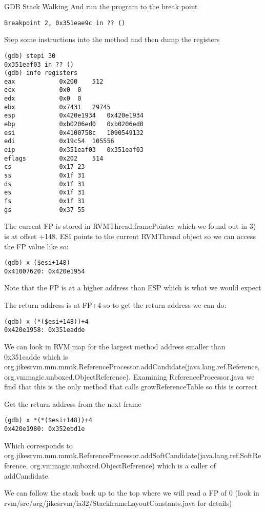 \begin{section}{GDB Stack Walking}
And run the program to the break point

\begin{lstlisting}
Breakpoint 2, 0x351eae9c in ?? ()
\end{lstlisting}

Step some instructions into the method and then dump the registers

\begin{lstlisting}
(gdb) stepi 30
0x351eaf03 in ?? ()
(gdb) info registers
eax            0x200	512
ecx            0x0	0
edx            0x0	0
ebx            0x7431	29745
esp            0x420e1934	0x420e1934
ebp            0xb0206ed0	0xb0206ed0
esi            0x4100758c	1090549132
edi            0x19c54	105556
eip            0x351eaf03	0x351eaf03
eflags         0x202	514
cs             0x17	23
ss             0x1f	31
ds             0x1f	31
es             0x1f	31
fs             0x1f	31
gs             0x37	55
\end{lstlisting}

The current FP is stored in RVMThread.framePointer which we found out in 3) is at offset +148. ESI points to the current RVMThread object so we can access the FP value like so:

\begin{lstlisting}
(gdb) x ($esi+148)
0x41007620:	0x420e1954
\end{lstlisting}

Note that the FP is at a higher address than ESP which is what we would expect

The return address is at FP+4 so to get the return address we can do:

\begin{lstlisting}
(gdb) x (*($esi+148))+4
0x420e1958:	0x351eadde
\end{lstlisting}

We can look in RVM.map for the largest method address smaller than 0x351eadde which is org.jikes\-rvm.mm.mmtk.Reference\-Processor.add\-Can\-di\-da\-te(java.\-lang.\-ref.\-Re\-fe\-rence, org.vmmagic.unboxed.Object\-Reference). Examining ReferenceProcessor.java we find that this is the only method that calls growReferenceTable so this is correct

Get the return address from the next frame

\begin{lstlisting}
(gdb) x *(*($esi+148))+4
0x420e1980:	0x352ebd1e
\end{lstlisting}

Which corresponds to org.jikes\-rvm.mm.mmtk.Reference\-Processor.add\-Soft\-Can\-di\-da\-te(java.\-lang\-.ref.\-Soft\-Reference, org.vmmagic.unboxed.Object\-Reference) which is a caller of addCandidate.

We can follow the stack back up to the top where we will read a FP of 0 (look in rvm/src/org/jikesrvm/ia32/StackframeLayoutConstants.java for details)


\end{section}